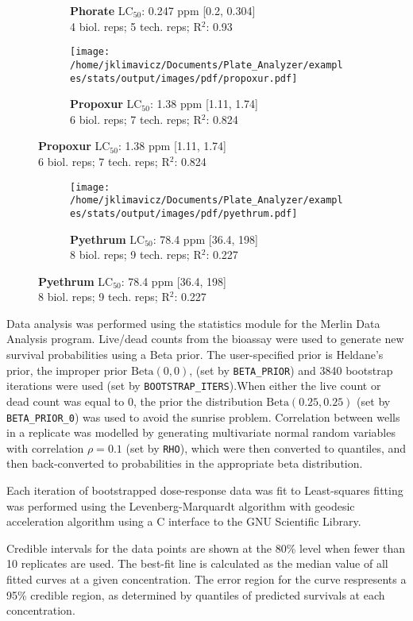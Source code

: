 \documentclass{article}
\begin{document}
\begin{figure}[thp!]
\begin{subfigure}{0.500\textwidth}
      \vspace{-0.05cm}
      \caption*{\textbf{Phorate} LC$_{50}$: 0.247 ppm [0.2, 0.304] \\ 
4 biol. reps; 5 tech. reps; R$^2$: 0.93}
      \vspace{0.1cm}
   \end{subfigure}%
   \begin{subfigure}{0.500\textwidth}
      \centering
      \texttt{[image: /home/jklimavicz/Documents/Plate\_Analyzer/examples/stats/output/images/pdf/propoxur.pdf]}
      \vspace{-0.05cm}
      \caption*{\textbf{Propoxur} LC$_{50}$: 1.38 ppm [1.11, 1.74] \\ 
6 biol. reps; 7 tech. reps; R$^2$: 0.824}
      \vspace{0.1cm}
   \end{subfigure}%
\end{figure}
\clearpage
\pagebreak
\vspace{-0.1cm}
\begin{figure}[thp!]
   \begin{subfigure}{0.500\textwidth}
      \centering
      \texttt{[image: /home/jklimavicz/Documents/Plate\_Analyzer/examples/stats/output/images/pdf/pyethrum.pdf]}
      \vspace{-0.05cm}
      \caption*{\textbf{Pyethrum} LC$_{50}$: 78.4 ppm [36.4, 198] \\ 
8 biol. reps; 9 tech. reps; R$^2$: 0.227}
      \vspace{0.1cm}
   \end{subfigure}%
\end{figure}
\pagebreak


Data analysis was performed using the statistics module for the Merlin Data Analysis program. 
Live/dead counts from the bioassay were used to generate new survival probabilities using a Beta prior. The user-specified prior is Heldane's prior, the improper prior $\text{Beta}(0,0)$, (set by \texttt{BETA\_PRIOR}) and 3840 bootstrap iterations were used (set by \texttt{BOOTSTRAP\_ITERS}).When either the live count or dead count was equal to 0, the prior the distribution $\text{Beta}(0.25,0.25)$ (set by \texttt{BETA\_PRIOR\_0}) was used to avoid the sunrise problem. Correlation between wells in a replicate was modelled by generating multivariate normal random variables with correlation $\rho = 0.1$ (set by \texttt{RHO}),  which were then converted to quantiles, and then back-converted to probabilities in the appropriate beta distribution. 

Each iteration of bootstrapped dose-response data was fit to  Least-squares fitting was performed using the Levenberg-Marquardt algorithm with geodesic acceleration algorithm using a C interface to the GNU Scientific Library. 

Credible intervals for the data points are shown at the 80\% level when fewer than 10 replicates are used. The best-fit line is calculated as the median value of all fitted curves at a given concentration. The error region for the curve respresents a 95\% credible region, as determined by quantiles of predicted survivals at each concentration.
\end{document}
